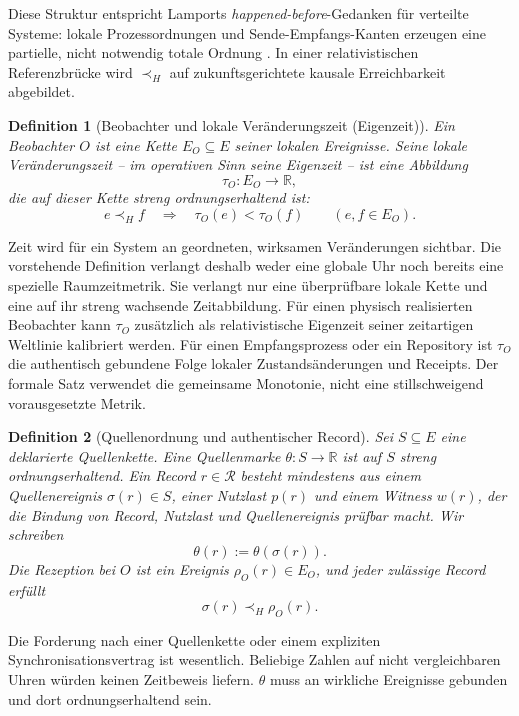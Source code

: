 \documentclass[11pt,a4paper]{article}
\newtheorem{definition}{Definition}[section]
\theoremstyle{remark}
\newcommand{\host}{\prec_{\!H}}
\newcommand{\records}{\mathcal{R}}
\begin{document}
Diese Struktur entspricht Lamports \emph{happened-before}-Gedanken für
verteilte Systeme: lokale Prozessordnungen und Sende-Empfangs-Kanten erzeugen
eine partielle, nicht notwendig totale Ordnung \cite{Lamport1978}. In einer
relativistischen Referenzbrücke wird \(\host\) auf zukunftsgerichtete kausale
Erreichbarkeit abgebildet.

\begin{definition}[Beobachter und lokale Veränderungszeit (Eigenzeit)]
Ein Beobachter \(O\) ist eine Kette \(E_O\subseteq E\) seiner lokalen
Ereignisse. Seine lokale Veränderungszeit -- im operativen Sinn seine
Eigenzeit -- ist eine Abbildung
\[
  \tau_O:E_O\longrightarrow\mathbb{R},
\]
die auf dieser Kette streng ordnungserhaltend ist:
\[
  e\host f\quad\Longrightarrow\quad \tau_O(e)<\tau_O(f)
  \qquad(e,f\in E_O).
\]
\end{definition}

Zeit wird für ein System an geordneten, wirksamen Veränderungen sichtbar. Die
vorstehende Definition verlangt deshalb weder eine globale Uhr noch bereits
eine spezielle Raumzeitmetrik. Sie verlangt nur eine überprüfbare lokale Kette
und eine auf ihr streng wachsende Zeitabbildung. Für einen physisch
realisierten Beobachter kann \(\tau_O\) zusätzlich als relativistische
Eigenzeit seiner zeitartigen Weltlinie kalibriert werden. Für einen
Empfangsprozess oder ein Repository ist \(\tau_O\) die authentisch gebundene
Folge lokaler Zustandsänderungen und Receipts. Der formale Satz verwendet die
gemeinsame Monotonie, nicht eine stillschweigend vorausgesetzte Metrik.

\begin{definition}[Quellenordnung und authentischer Record]
Sei \(S\subseteq E\) eine deklarierte Quellenkette. Eine Quellenmarke
\(\theta:S\to\mathbb{R}\) ist auf \(S\) streng ordnungserhaltend. Ein Record
\(r\in\records\) besteht mindestens aus einem Quellenereignis \(\sigma(r)\in
S\), einer Nutzlast \(p(r)\) und einem Witness \(w(r)\), der die Bindung von
Record, Nutzlast und Quellenereignis prüfbar macht. Wir schreiben
\[
  \theta(r):=\theta(\sigma(r)).
\]
Die Rezeption bei \(O\) ist ein Ereignis \(\rho_O(r)\in E_O\), und jeder
zulässige Record erfüllt
\[
  \sigma(r)\host\rho_O(r).
\]
\end{definition}

Die Forderung nach einer Quellenkette oder einem expliziten
Synchronisationsvertrag ist wesentlich. Beliebige Zahlen auf nicht
vergleichbaren Uhren würden keinen Zeitbeweis liefern. \(\theta\) muss an
wirkliche Ereignisse gebunden und dort ordnungserhaltend sein.
\end{document}

